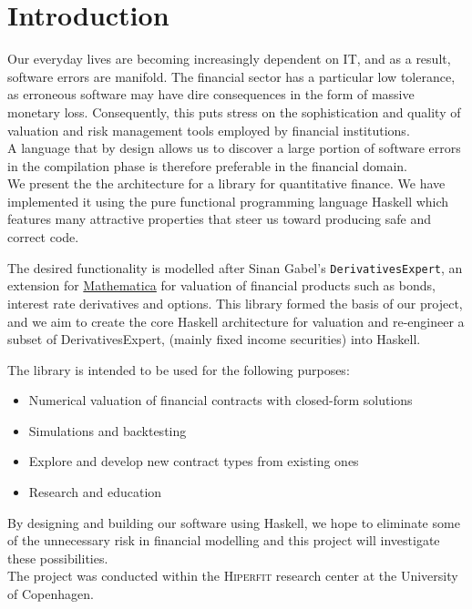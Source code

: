 \chapter{Introduction}

Our everyday lives are becoming increasingly dependent on IT, and as a result,
software errors are manifold. The financial sector has a particular low 
tolerance, as erroneous software may have dire consequences in the form of
massive monetary loss. Consequently, this puts stress on the sophistication and 
quality of valuation and risk management tools employed by financial institutions.\\
A language that by design allows us to discover a large portion of software
errors in the compilation phase is therefore preferable in the financial domain.\\

We present the the architecture for a library for quantitative finance. We have
implemented it using the pure functional programming language Haskell which
features many attractive properties that steer us toward producing safe and
correct code. 

The desired functionality is modelled after Sinan Gabel's 
\texttt{DerivativesExpert}\cite{Mathematica:DerivativesExpert},
an extension for \href{http://www.wolfram.com/mathematica/}{Mathematica}
for valuation of financial products such as bonds, interest rate derivatives 
and options. This library formed the basis of our project, and we aim to create
the core Haskell architecture for valuation and re-engineer a subset of DerivativesExpert, 
(mainly fixed income securities) into Haskell.

The library is intended to be used for the following purposes:

\begin{itemize}
\item Numerical valuation of financial contracts with closed-form solutions
\item Simulations and backtesting
\item Explore and develop new contract types from existing ones
\item Research and education
\end{itemize}

By designing and building our software using Haskell, we hope to eliminate 
some of the unnecessary risk in financial modelling and this project
will investigate these possibilities.\\

The project was conducted within the \textsc{Hiperfit} research center at the
University of Copenhagen.
